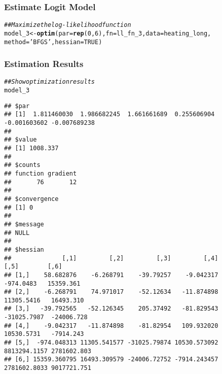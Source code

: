 \documentclass{beamer}\usepackage[]{graphicx}\usepackage[]{color}
\makeatletter
\newcommand{\hlnum}[1]{\textcolor[rgb]{0.686,0.059,0.569}{#1}}%
\newcommand{\hlstr}[1]{\textcolor[rgb]{0.192,0.494,0.8}{#1}}%
\newcommand{\hlcom}[1]{\textcolor[rgb]{0.678,0.584,0.686}{\textit{#1}}}%
\newcommand{\hlstd}[1]{\textcolor[rgb]{0.345,0.345,0.345}{#1}}%
\newcommand{\hlkwb}[1]{\textcolor[rgb]{0.69,0.353,0.396}{#1}}%
\newcommand{\hlkwc}[1]{\textcolor[rgb]{0.333,0.667,0.333}{#1}}%
\newcommand{\hlkwd}[1]{\textcolor[rgb]{0.737,0.353,0.396}{\textbf{#1}}}%
\newenvironment{kframe}{%
 \def\at@end@of@kframe{}%
 \ifinner\ifhmode%
  \def\at@end@of@kframe{\end{minipage}}%
  \begin{minipage}{\columnwidth}%
 \fi\fi%
 \def\FrameCommand##1{\hskip\@totalleftmargin \hskip-\fboxsep
 \colorbox{shadecolor}{##1}\hskip-\fboxsep
     \hskip-\linewidth \hskip-\@totalleftmargin \hskip\columnwidth}%
 \MakeFramed {\advance\hsize-\width
   \@totalleftmargin\z@ \linewidth\hsize
   \@setminipage}}%
 {\par\unskip\endMakeFramed%
 \at@end@of@kframe}
\newenvironment{knitrout}{}{} %
\makeatother
\begin{document}
\begin{frame}[fragile]\frametitle{Estimate Logit Model}
\begin{knitrout}\footnotesize
{}\color{fgcolor}\begin{kframe}
\begin{alltt}
\hlcom{## Maximize the log-likelihood function}
\hlstd{model_3} \hlkwb{<-} \hlkwd{optim}\hlstd{(}\hlkwc{par} \hlstd{=} \hlkwd{rep}\hlstd{(}\hlnum{0}\hlstd{,} \hlnum{6}\hlstd{),} \hlkwc{fn} \hlstd{= ll_fn_3,} \hlkwc{data} \hlstd{= heating_long,}
                 \hlkwc{method} \hlstd{=} \hlstr{'BFGS'}\hlstd{,} \hlkwc{hessian} \hlstd{=} \hlnum{TRUE}\hlstd{)}
\end{alltt}
\end{kframe}
\end{knitrout}
\end{frame}

\begin{frame}[fragile]\frametitle{Estimation Results}
    \vspace{1ex}
    
\begin{knitrout}\tiny
{}\color{fgcolor}\begin{kframe}
\begin{alltt}
\hlcom{## Show optimization results}
\hlstd{model_3}
\end{alltt}
\begin{verbatim}
## $par
## [1]  1.811460030  1.986682245  1.661661689  0.255606904 -0.001603602 -0.007689238
## 
## $value
## [1] 1008.337
## 
## $counts
## function gradient 
##       76       12 
## 
## $convergence
## [1] 0
## 
## $message
## NULL
## 
## $hessian
##              [,1]         [,2]         [,3]         [,4]         [,5]        [,6]
## [1,]    58.682876    -6.268791    -39.79257    -9.042317    -974.0483   15359.361
## [2,]    -6.268791    74.971017    -52.12634   -11.874898   11305.5416   16493.310
## [3,]   -39.792565   -52.126345    205.37492   -81.829543  -31025.7987  -24006.728
## [4,]    -9.042317   -11.874898    -81.82954   109.932020   10530.5731   -7914.243
## [5,]  -974.048313 11305.541577 -31025.79874 10530.573092 8813294.1157 2781602.803
## [6,] 15359.360795 16493.309579 -24006.72752 -7914.243457 2781602.8033 9017721.751
\end{verbatim}
\end{kframe}
\end{knitrout}
\end{frame}
\end{document}
